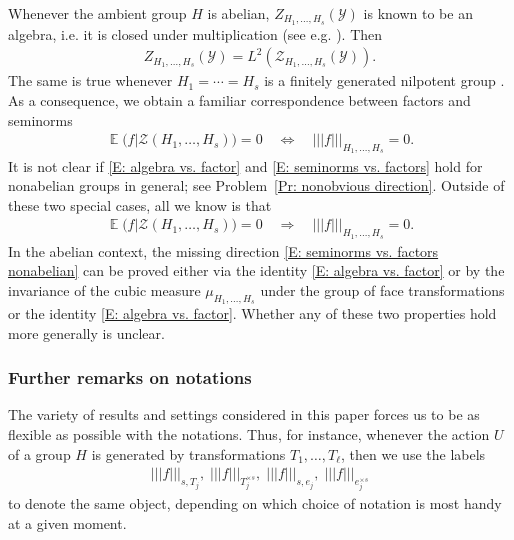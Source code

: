\documentclass[11pt]{amsart}
\theoremstyle{definition}
\DeclareMathOperator*{\E}{\mathbb{E}}
\newcommand{\CD}{{\mathcal D}}
\newcommand{\CY}{{\mathcal Y}}
\newcommand{\CZ}{{\mathcal Z}}
\newcommand{\nnorm}[1]{\lvert\!|\!| #1|\!|\!\rvert}
\newcommand{\1}{{\mathbf{1}}}
\begin{document}
Whenever the ambient group $H$ is abelian, $Z_{H_1, \ldots, H_s}(\CY)$ is known to be an algebra, i.e. it is closed under multiplication (see e.g. \cite[Proposition~2.3]{TZ16}). Then
\begin{align}\label{E: algebra vs. factor}
    Z_{H_1, \ldots, H_s}(\CY) = L^2(\CZ_{H_1, \ldots, H_s}(\CY)).
\end{align}
The same is true whenever $H_1 = \cdots = H_s$ is a finitely generated nilpotent group \cite[Lemma~5.8]{CS23}. As a consequence, we obtain a familiar correspondence between factors and seminorms
\begin{align}\label{E: seminorms vs. factors}
     \E(f|\CZ(H_1, \ldots, H_s)) = 0\quad \iff \quad \nnorm{f}_{H_1, \ldots, H_s} = 0.
\end{align}
It is not clear if \eqref{E: algebra vs. factor} and \eqref{E: seminorms vs. factors} hold for nonabelian groups in general; see Problem~\ref{Pr: nonobvious direction}. Outside of these two special cases, all we know is that
\begin{align}\label{E: seminorms vs. factors nonabelian}
        \E(f|\CZ(H_1, \ldots, H_s)) = 0\quad \Longrightarrow \quad \nnorm{f}_{H_1, \ldots, H_s} = 0.
\end{align}
In the abelian context, the missing direction \eqref{E: seminorms vs. factors nonabelian} can be proved either via the identity \eqref{E: algebra vs. factor} or by the invariance of the cubic measure $\mu_{H_1, \ldots, H_s}$ under the group of face transformations or the identity \eqref{E: algebra vs. factor}. Whether any of these two properties hold more generally is unclear.


\subsubsection{Further remarks on notations}
The variety of results and settings considered in this paper forces us to be as flexible as possible with the notations. Thus, for instance, whenever the action $U$ of a group $H$ is generated by transformations $T_1, \ldots, T_\ell$, then we use the labels
\begin{align*}
 \nnorm{f}_{s, T_j},\; \nnorm{f}_{T_j^{\times s}},\; \nnorm{f}_{s, e_j},\; \nnorm{f}_{e_j^{\times s}}   
\end{align*}
to denote the same object, depending on which choice of notation is most handy at a given moment.
\end{document}
